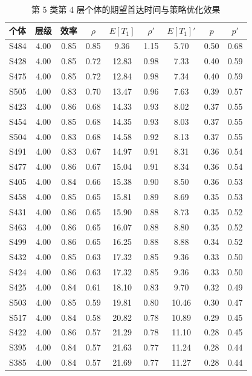 \begin{table}[htbp]
\centering
\small
\caption{第 5 类第 4 层个体的期望首达时间与策略优化效果}
\label{tab:time}
\begin{tabular}{lcccccccc}
\toprule
个体 & 层级 & 效率 & $\rho$ & $E[T_1]$ & $\rho'$ & $E[T_1]'$ & $p$ & $p'$ \\
\midrule
S484 & 4.00 & 0.85 & 0.85 & 9.36 & 1.15 & 5.70 & 0.50 & 0.68 \\
S428 & 4.00 & 0.85 & 0.72 & 12.83 & 0.98 & 7.33 & 0.40 & 0.59 \\
S475 & 4.00 & 0.85 & 0.72 & 12.84 & 0.98 & 7.34 & 0.40 & 0.59 \\
S505 & 4.00 & 0.83 & 0.70 & 13.47 & 0.96 & 7.63 & 0.39 & 0.57 \\
S423 & 4.00 & 0.86 & 0.68 & 14.33 & 0.93 & 8.02 & 0.37 & 0.55 \\
S454 & 4.00 & 0.85 & 0.68 & 14.35 & 0.93 & 8.03 & 0.37 & 0.55 \\
S504 & 4.00 & 0.83 & 0.68 & 14.58 & 0.92 & 8.13 & 0.37 & 0.55 \\
S491 & 4.00 & 0.83 & 0.67 & 14.97 & 0.91 & 8.31 & 0.36 & 0.54 \\
S477 & 4.00 & 0.86 & 0.67 & 15.04 & 0.91 & 8.34 & 0.36 & 0.54 \\
S405 & 4.00 & 0.84 & 0.66 & 15.38 & 0.90 & 8.50 & 0.36 & 0.53 \\
S458 & 4.00 & 0.85 & 0.65 & 15.81 & 0.89 & 8.69 & 0.35 & 0.53 \\
S431 & 4.00 & 0.86 & 0.65 & 15.90 & 0.88 & 8.73 & 0.35 & 0.52 \\
S463 & 4.00 & 0.86 & 0.65 & 16.07 & 0.88 & 8.80 & 0.35 & 0.52 \\
S499 & 4.00 & 0.86 & 0.65 & 16.25 & 0.88 & 8.88 & 0.34 & 0.52 \\
S432 & 4.00 & 0.85 & 0.63 & 17.32 & 0.85 & 9.36 & 0.33 & 0.50 \\
S424 & 4.00 & 0.86 & 0.63 & 17.32 & 0.85 & 9.36 & 0.33 & 0.50 \\
S425 & 4.00 & 0.84 & 0.61 & 18.10 & 0.83 & 9.70 & 0.32 & 0.49 \\
S503 & 4.00 & 0.85 & 0.59 & 19.81 & 0.80 & 10.46 & 0.30 & 0.47 \\
S517 & 4.00 & 0.84 & 0.58 & 20.82 & 0.78 & 10.89 & 0.29 & 0.45 \\
S422 & 4.00 & 0.86 & 0.57 & 21.29 & 0.78 & 11.10 & 0.28 & 0.45 \\
S395 & 4.00 & 0.84 & 0.57 & 21.63 & 0.77 & 11.24 & 0.28 & 0.44 \\
S385 & 4.00 & 0.84 & 0.57 & 21.69 & 0.77 & 11.27 & 0.28 & 0.44 \\
\bottomrule
\end{tabular}
\end{table}
